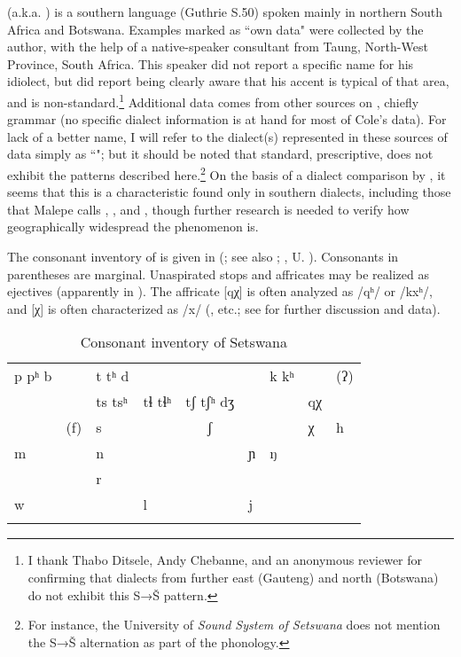  (a.k.a. ) is a southern  language (Guthrie S.50) spoken mainly in northern South Africa and Botswana. Examples marked as ``own data" were collected by the author, with the help of a native-speaker consultant from Taung, North-West Province, South Africa. This speaker did not report a specific name for his idiolect, but did report being clearly aware that his accent is typical of that area, and is non-standard.\footnote{I thank Thabo Ditsele, Andy Chebanne, and an anonymous reviewer for confirming that  dialects from further east (Gauteng) and north (Botswana) do not exhibit this S→Š pattern.} Additional data comes from other sources on , chiefly  grammar (no specific dialect information is at hand for most of Cole’s data). For lack of a better name, I will refer to the dialect(s) represented in these sources of data simply as ``"; but it should be noted that standard, prescriptive,  does not exhibit the patterns described here.\footnote{For instance, the University of  \textit{Sound System of Setswana} does not mention the S→Š alternation as part of the phonology.} On the basis of a dialect comparison by \citet{Malepe1966}, it seems that this is a characteristic found only in southern dialects, including those that Malepe calls , , and , though further research is needed to verify how geographically widespread the phenomenon is.

The consonant inventory of  is given in  %
 (\citealt{Bennett2016}; see also \citealt{Cole1955}; \citealt{chebanneetal1997}, U. \citealt{University-of-Botswana:2001aa}). Consonants in parentheses are marginal. Unaspirated stops and affricates may be realized as ejectives (apparently in ). The affricate [qχ] is often analyzed as /qʰ/ or /kxʰ/, and [χ] is often characterized as /x/ (\citealt{Cole1955}, etc.; see \citealt{Bennett2016} for further discussion and data).
 
\vspace{.05in}
\begin{table}
\begin{tabularx}{\textwidth}{XXXXcXXXX}
\lsptoprule

p pʰ   b &  & t   tʰ   d &  &  &  & k  kʰ &  & (ʔ)\\
&  & ts tsʰ & tɬ   tɬʰ & tʃ   tʃʰ dʒ &  &  & qχ & \\
& (f) & s &  & ʃ &  &  & χ & h \\
m &  & n &  &  & ɲ & ŋ &  & \\
&  & r &  &  &  &  &  & \\
w &  &  & l &  & j &  &  & \\
\lspbottomrule
\end{tabularx}
\caption{Consonant inventory of Setswana}
\label{tab:bennett:1}
\end{table}

